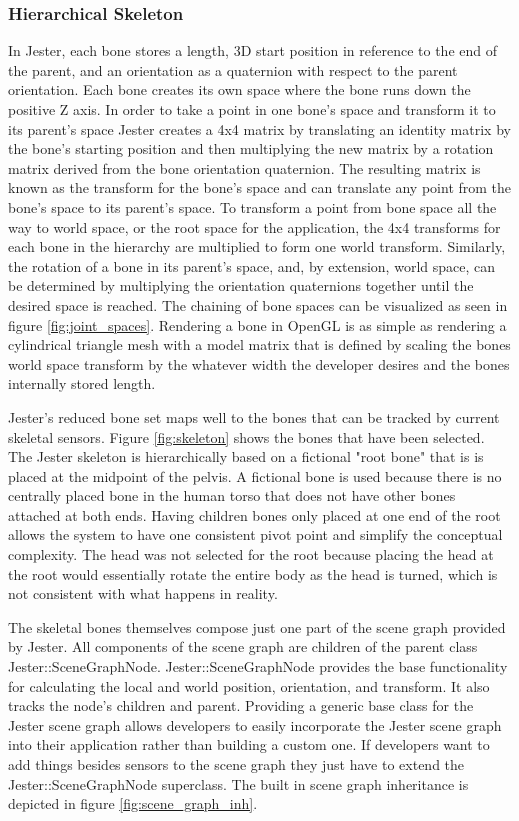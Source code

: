 \subsubsection{Hierarchical Skeleton}\label{sec:bone_hierarchy}

In Jester, each bone stores a length, 3D start position in reference to the end of the parent, and an orientation as a quaternion with respect to the parent orientation. Each bone creates its own space where the bone runs down the positive Z axis. In order to take a point in one bone’s space and transform it to its parent’s space Jester creates a 4x4 matrix by translating an identity matrix by the bone’s starting position and then multiplying the new matrix by a rotation matrix derived from the bone orientation quaternion. The resulting matrix is known as the transform for the bone’s space and can translate any point from the bone’s space to its parent’s space. To transform a point from bone space all the way to world space, or the root space for the application, the 4x4 transforms for each bone in the hierarchy are multiplied to form one world transform. Similarly, the rotation of a bone in its parent’s space, and, by extension, world space, can be determined by multiplying the orientation quaternions together until the desired space is reached. The chaining of bone spaces can be visualized as seen in figure \ref{fig:joint_spaces}. Rendering a bone in OpenGL is as simple as rendering a cylindrical triangle mesh with a model matrix that is defined by scaling the bones world space transform by the whatever width the developer desires and the bones internally stored length.

Jester's reduced bone set maps well to the bones that can be tracked by current skeletal sensors. Figure \ref{fig:skeleton} shows the bones that have been selected. The Jester skeleton is hierarchically based on a fictional "root bone" that is is placed at the midpoint of the pelvis. A fictional bone is used because there is no centrally placed bone in the human torso that does not have other bones attached at both ends. Having children bones only placed at one end of the root allows the system to have one consistent pivot point and simplify the conceptual complexity. The head was not selected for the root because placing the head at the root would essentially rotate the entire body as the head is turned, which is not consistent with what happens in reality.

The skeletal bones themselves compose just one part of the scene graph provided by Jester. All components of the scene graph are children of the parent class Jester::SceneGraphNode. Jester::SceneGraphNode provides the base functionality for calculating the local and world position, orientation, and transform. It also tracks the node’s children and parent. Providing a generic base class for the Jester scene graph allows developers to easily incorporate the Jester scene graph into their application rather than building a custom one. If developers want to add things besides sensors to the scene graph they just have to extend the Jester::SceneGraphNode superclass. The built in scene graph inheritance is depicted in figure \ref{fig:scene_graph_inh}.

